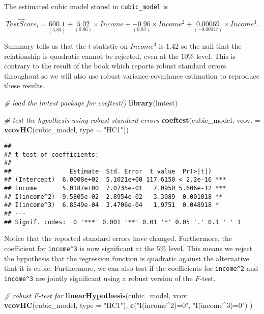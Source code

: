 \documentclass[]{book}
\newenvironment{Shaded}{\begin{snugshade}}{\end{snugshade}}
\newcommand{\KeywordTok}[1]{\textcolor[rgb]{0.13,0.29,0.53}{\textbf{#1}}}
\newcommand{\DataTypeTok}[1]{\textcolor[rgb]{0.13,0.29,0.53}{#1}}
\newcommand{\StringTok}[1]{\textcolor[rgb]{0.31,0.60,0.02}{#1}}
\newcommand{\CommentTok}[1]{\textcolor[rgb]{0.56,0.35,0.01}{\textit{#1}}}
\newcommand{\NormalTok}[1]{#1}
\theoremstyle{definition}
\theoremstyle{definition}
\theoremstyle{definition}
\theoremstyle{remark}
\begin{document}
The estimated cubic model stored in \texttt{cubic\_model} is

\[ \widehat{TestScore}_i = \underset{(5.83)}{600.1} + \underset{(0.86)}{5.02} \times Income + \underset{(0.03)}{-0.96} \times Income^2 + \underset{(-0.00047)}{0.00069}  \times Income^3. \]

Summary tells us that the \(t\)-statistic on \(Income^3\) is \(1.42\) so
the null that the relationship is quadratic cannot be rejected, even at
the \(10\%\) level. This is contrary to the result of the book which
reports robust standard errors throughout so we will also use robust
variance-covariance estimation to reproduce these results.

\begin{Shaded}
\begin{Highlighting}[]
\CommentTok{# load the lmtest package for coeftest()}
\KeywordTok{library}\NormalTok{(lmtest)}

\CommentTok{# test the hypothesis using robust standard errors}
\KeywordTok{coeftest}\NormalTok{(cubic_model, }\DataTypeTok{vcov. =} \KeywordTok{vcovHC}\NormalTok{(cubic_model, }\DataTypeTok{type =} \StringTok{"HC1"}\NormalTok{))}
\end{Highlighting}
\end{Shaded}

\begin{verbatim}
## 
## t test of coefficients:
## 
##                Estimate  Std. Error  t value  Pr(>|t|)    
## (Intercept)  6.0008e+02  5.1021e+00 117.6150 < 2.2e-16 ***
## income       5.0187e+00  7.0735e-01   7.0950 5.606e-12 ***
## I(income^2) -9.5805e-02  2.8954e-02  -3.3089  0.001018 ** 
## I(income^3)  6.8549e-04  3.4706e-04   1.9751  0.048918 *  
## ---
## Signif. codes:  0 '***' 0.001 '**' 0.01 '*' 0.05 '.' 0.1 ' ' 1
\end{verbatim}

Notice that the reported standard errors have changed. Furthermore, the
coefficient for \texttt{income\^{}3} is now significant at the \(5\%\)
level. This means we reject the hypothesis that the regression function
is quadratic against the alternative that it is cubic. Furthermore, we
can also test if the coefficients for \texttt{income\^{}2} and
\texttt{income\^{}3} are jointly significant using a robust version of
the \(F\)-test.

\begin{Shaded}
\begin{Highlighting}[]
\CommentTok{# robust F-test for }
\KeywordTok{linearHypothesis}\NormalTok{(cubic_model, }
                 \DataTypeTok{vcov. =} \KeywordTok{vcovHC}\NormalTok{(cubic_model, }\DataTypeTok{type =} \StringTok{"HC1"}\NormalTok{),}
                 \KeywordTok{c}\NormalTok{(}\StringTok{"I(income^2)=0"}\NormalTok{, }\StringTok{"I(income^3)=0"}\NormalTok{)}
\NormalTok{                 )}
\end{Highlighting}
\end{Shaded}
\end{document}
